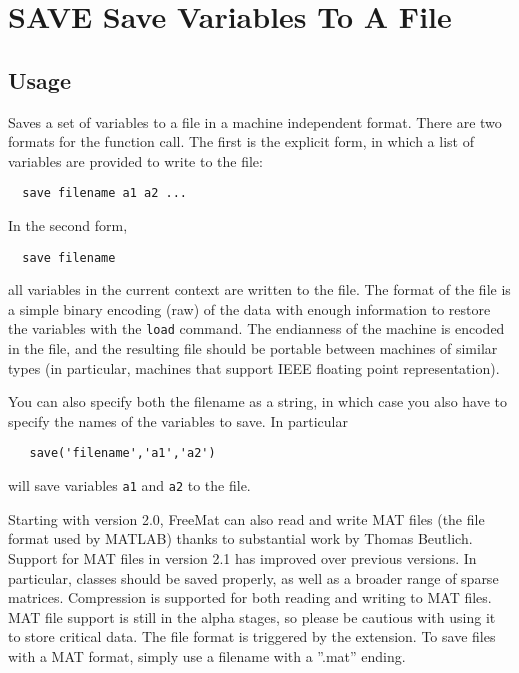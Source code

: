 \section{SAVE Save Variables To A File}

\subsection{Usage}

Saves a set of variables to a file in a machine independent format.
There are two formats for the function call.  The first is the explicit
form, in which a list of variables are provided to write to the file:
\begin{verbatim}
  save filename a1 a2 ...
\end{verbatim}
In the second form,
\begin{verbatim}
  save filename
\end{verbatim}
all variables in the current context are written to the file.  The 
format of the file is a simple binary encoding (raw) of the data
with enough information to restore the variables with the \verb|load|
command.  The endianness of the machine is encoded in the file, and
the resulting file should be portable between machines of similar
types (in particular, machines that support IEEE floating point 
representation).

You can also specify both the filename as a string, in which case
you also have to specify the names of the variables to save.  In
particular
\begin{verbatim}
   save('filename','a1','a2')
\end{verbatim}
will save variables \verb|a1| and \verb|a2| to the file.

Starting with version 2.0, FreeMat can also read and write MAT
files (the file format used by MATLAB) thanks to substantial 
work by Thomas Beutlich.  Support for MAT files in version 2.1
has improved over previous versions.  In particular, classes
should be saved properly, as well as a broader range of sparse
matrices.  Compression is supported for both reading and writing
to MAT files.  MAT file support is still in the alpha stages, so 
please be cautious with using it to store critical 
data.  The file format is triggered
by the extension.  To save files with a MAT format, simply
use a filename with a ''.mat'' ending.

